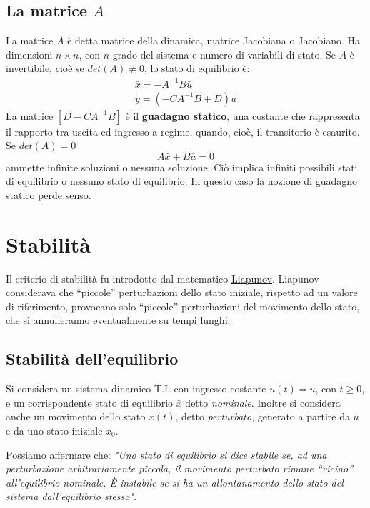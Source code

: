 \documentclass[a4paper]{report}
\begin{document}
\subsection{La matrice $A$}
La matrice $A$ \`e detta matrice della dinamica, matrice
Jacobiana o Jacobiano. Ha dimensioni $n \times n$, con $n$ grado del sistema e numero
di variabili di stato. Se $A$ \`e invertibile, cio\`e se $det(A) \neq
0$, lo stato di equilibrio \`e:
\[
  \begin{array}{l}
    \bar{x} = -A^{-1} B \bar{u}\\
    \bar{y} = ( -C A^{-1} B + D) \bar{u}
  \end{array}
\]
La matrice $[D - CA^{-1} B]$ \`e il {\bf guadagno
  statico}, una costante che rappresenta il
rapporto tra uscita ed ingresso a regime, quando, cio\`e, il
transitorio \`e esaurito. Se $det(A) = 0$ 
\[
  A \bar{x} + B \bar{u} = 0
\]
ammette infinite soluzioni o nessuna soluzione. Ci\`o implica infiniti
possibili stati di equilibrio o nessuno stato di equilibrio. In questo
caso la nozione di guadagno statico perde senso.

\section{Stabilit\`a}
Il criterio di stabilit\`a fu introdotto dal matematico
\href{http://it.wikipedia.org/wiki/Aleksandr_Michajlovi\%C4\%8D_Ljapunov}{Liapunov}. Liapunov
considerava che ``piccole'' perturbazioni dello stato
iniziale, rispetto ad un valore di riferimento, provocano solo ``piccole''
perturbazioni del movimento dello stato, che si annulleranno
eventualmente su tempi lunghi. 

\subsection{Stabilit\`a dell'equilibrio}
Si considera un sistema dinamico T.I. con ingresso costante
$u(t)=\bar{u}$, con $t \ge 0$, e un corrispondente stato di equilibrio
$\bar{x}$ detto \emph{nominale}. Inoltre si considera anche un
movimento dello stato $x(t)$, detto \emph{perturbato}, generato a
partire da $\bar{u}$ e da uno stato iniziale $x_0$.

Possiamo affermare che: \emph{"Uno stato di equilibrio si dice stabile
  se, ad una perturbazione arbitrariamente piccola, il movimento
  perturbato rimane ``vicino'' all'equilibrio nominale. \`E instabile
  se si ha un allontanamento dello stato del sistema dall'equilibrio
  stesso"}.
\end{document}
